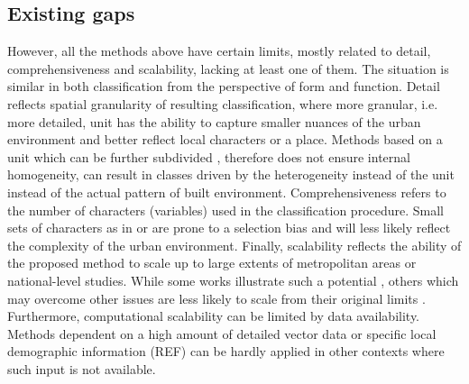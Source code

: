 \subsection{Existing gaps}
\label{sec:lit_gaps}
However, all the methods above have certain limits, mostly related to detail,
comprehensiveness and scalability, lacking at least one of them. The situation is
similar in both classification from the perspective of form and function. Detail
reflects spatial granularity of resulting classification, where more granular, i.e. more
detailed, unit has the ability to capture smaller nuances of the urban environment and
better reflect local characters or a place. Methods based on a unit which can be further
subdivided \citep{dibble2019origin,jochem2020,araldi2019,gil2012}, therefore does not
ensure internal homogeneity, can result in classes driven by the heterogeneity instead
of the unit instead of the actual pattern of built environment. Comprehensiveness refers
to the number of characters (variables) used in the classification procedure. Small sets
of characters as in \cite{bobkova2019} or \cite{serra2018a} are prone to a selection
bias and will less likely reflect the complexity of the urban environment. Finally,
scalability reflects the ability of the proposed method to scale up to large extents of
metropolitan areas or national-level studies. While some works illustrate such a
potential \citep{jochem2020, schirmer2015,bobkova2019,araldi2019}, others which may
overcome other issues are less likely to scale from their original limits
\citep{dibble2019origin}. Furthermore, computational scalability can be limited by data
availability. Methods dependent on a high amount of detailed vector data
\citep{bobkova2019} or specific local demographic information (REF) can be hardly
applied in other contexts where such input is not available. 



